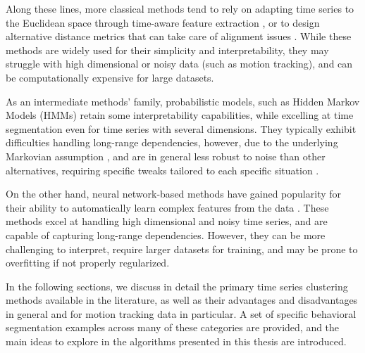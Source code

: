 Along these lines, more classical methods tend to rely on adapting time series to the Euclidean space through time-aware feature extraction \cite{Christ2018TimePackage}, or to design alternative distance metrics that can take care of alignment issues \cite{Tavenard2021AnWarping}. While these methods are widely used for their simplicity and interpretability, they may struggle with high dimensional or noisy data (such as motion tracking), and can be computationally expensive for large datasets.

As an intermediate methods' family, probabilistic models, such as Hidden Markov Models (HMMs) retain some interpretability capabilities, while excelling at time segmentation even for time series with several dimensions. They typically exhibit difficulties handling long-range dependencies, however, due to the underlying Markovian assumption \cite{Murphy2022ProbabilisticIntroduction}, and are in general less robust to noise than other alternatives, requiring specific tweaks tailored to each specific situation \cite{Weinreb2023Keypoint-MoSeq:Dynamics}.

On the other hand, neural network-based methods have gained popularity for their ability to automatically learn complex features from the data \cite{Lafabregue2022End-to-endStudy}. These methods excel at handling high dimensional and noisy time series, and are capable of capturing long-range dependencies. However, they can be more challenging to interpret, require larger datasets for training, and may be prone to overfitting if not properly regularized.

In the following sections, we discuss in detail the primary time series clustering methods available in the literature, as well as their advantages and disadvantages in general and for motion tracking data in particular. A set of specific behavioral segmentation examples across many of these categories are provided, and the main ideas to explore in the algorithms presented in this thesis are introduced.

